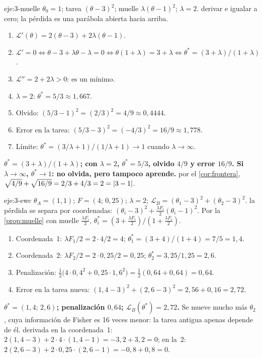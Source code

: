 \begin{solucion}{eje:3-muelle}
\datos $\theta_0=1$; tarea $(\theta-3)^{2}$; muelle $\lambda(\theta-1)^{2}$; $\lambda=2$.
\planteamiento derivar e igualar a cero; la pérdida es una parábola abierta hacia arriba.
\pasos
\begin{enumerate}[label=\arabic*.]
  \item $\mathcal{L}'(\theta)=2(\theta-3)+2\lambda(\theta-1)$.
  \item $\mathcal{L}'=0\iff\theta-3+\lambda\theta-\lambda=0\iff\theta(1+\lambda)=3+\lambda\iff\theta^{\ast}=(3+\lambda)/(1+\lambda)$.
  \item $\mathcal{L}''=2+2\lambda>0$: es un mínimo.
  \item $\lambda=2$: $\theta^{\ast}=5/3\approx 1{,}667$.
  \item Olvido: $(5/3-1)^{2}=(2/3)^{2}=4/9\approx 0{,}4444$.
  \item Error en la tarea: $(5/3-3)^{2}=(-4/3)^{2}=16/9\approx 1{,}778$.
  \item Límite: $\theta^{\ast}=(3/\lambda+1)/(1/\lambda+1)\to 1$ cuando $\lambda\to\infty$.
\end{enumerate}
\resultado \textbf{$\theta^{\ast}=(3+\lambda)/(1+\lambda)$; con $\lambda=2$, $\theta^{\ast}=5/3$, olvido $4/9$ y error $16/9$. Si $\lambda\to\infty$, $\theta^{\ast}\to 1$: no olvida, pero tampoco aprende.}
\comprobacion por el \cref{cor:frontera}, $\sqrt{4/9}+\sqrt{16/9}=2/3+4/3=2=\lvert3-1\rvert$.
\end{solucion}

\begin{solucion}{eje:3-ewc}
\datos $\theta_A=(1,1)$; $F=(4;\,0{,}25)$; $\lambda=2$; $\mathcal{L}_B=(\theta_1-3)^{2}+(\theta_2-3)^{2}$.
\planteamiento la pérdida se separa por coordenadas: $(\theta_i-3)^{2}+\frac{\lambda F_i}{2}(\theta_i-1)^{2}$. Por la \cref{prop:muelle} con muelle $\frac{\lambda F_i}{2}$, $\theta_i^{\ast}=(3+\frac{\lambda F_i}{2})/(1+\frac{\lambda F_i}{2})$.
\pasos
\begin{enumerate}[label=\arabic*.]
  \item Coordenada~1: $\lambda F_1/2=2\cdot 4/2=4$; $\theta^{\ast}_1=(3+4)/(1+4)=7/5=1{,}4$.
  \item Coordenada~2: $\lambda F_2/2=2\cdot 0{,}25/2=0{,}25$; $\theta^{\ast}_2=3{,}25/1{,}25=2{,}6$.
  \item Penalización: $\frac12\bigl(4\cdot 0{,}4^{2}+0{,}25\cdot 1{,}6^{2}\bigr)=\frac12(0{,}64+0{,}64)=0{,}64$.
  \item Error en la tarea nueva: $(1{,}4-3)^{2}+(2{,}6-3)^{2}=2{,}56+0{,}16=2{,}72$.
\end{enumerate}
\resultado \textbf{$\theta^{\ast}=(1{,}4;\,2{,}6)$; penalización $0{,}64$; $\mathcal{L}_B(\theta^{\ast})=2{,}72$.} Se mueve mucho más $\theta_2$, cuya información de Fisher es 16 veces menor: la tarea antigua apenas depende de él.
\comprobacion derivada en la coordenada~1: $2(1{,}4-3)+2\cdot 4\cdot(1{,}4-1)=-3{,}2+3{,}2=0$; en la~2: $2(2{,}6-3)+2\cdot 0{,}25\cdot(2{,}6-1)=-0{,}8+0{,}8=0$.
\end{solucion}

